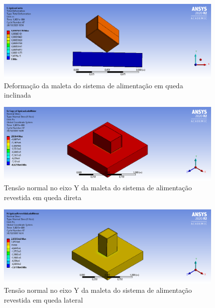 \begin{apendicesenv}
\begin{figure}[htb]
    \centering
    \includegraphics[width=1.0\textwidth, angle=0]{figuras/estrutura_simulacaoImpacto/ignicaoDeformacaoCanto.png}
    \caption{Deformação da maleta do sistema de alimentação em queda inclinada}
    \label{fig:simulacaoImpacto_09}
\end{figure}

\begin{figure}[htb]
    \centering
    \includegraphics[width=1.0\textwidth, angle=0]{figuras/estrutura_simulacaoImpacto/ignicaoRevestidaNormalYMaior.png}
    \caption{Tensão normal no eixo Y da maleta do sistema de alimentação revestida em queda direta}
    \label{fig:simulacaoImpacto_10}
\end{figure}

\begin{figure}[htb]
    \centering
    \includegraphics[width=1.0\textwidth, angle=0]{figuras/estrutura_simulacaoImpacto/ignicaoRevestidaNormalYMenor.png}
    \caption{Tensão normal no eixo Y da maleta do sistema de alimentação revestida em queda lateral}
    \label{fig:simulacaoImpacto_11}
\end{figure}


\end{apendicesenv}

